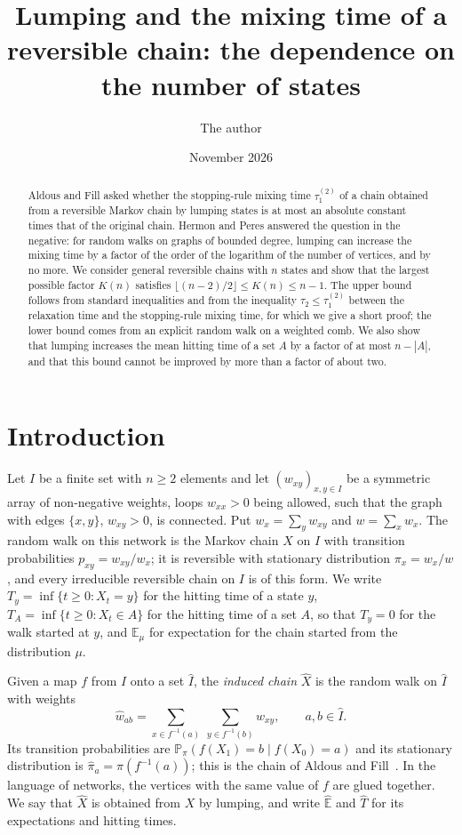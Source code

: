 \documentclass[11pt]{amsart}
\title[Lumping and the mixing time of a reversible chain]{Lumping and the mixing time of a reversible chain:
the dependence on the number of states}
\author{The author}
\date{November 2026}
\theoremstyle{definition}
\newcommand{\Prob}{\mathbb{P}}
\newcommand{\E}{\mathbb{E}}
\newcommand{\tmix}{\tau_1^{(2)}}
\newcommand{\hE}{\widehat{\E}}
\newcommand{\hw}{\widehat{w}}
\newcommand{\hpi}{\widehat{\pi}}
\newcommand{\hI}{\widehat{I}}
\newcommand{\hX}{\widehat{X}}
\begin{document}
\begin{abstract}
Aldous and Fill asked whether the stopping-rule mixing time $\tmix$ of a chain obtained from a reversible Markov
chain by lumping states is at most an absolute constant times that of the original chain. Hermon and Peres answered
the question in the negative: for random walks on graphs of bounded degree, lumping can increase the mixing time by a
factor of the order of the logarithm of the number of vertices, and by no more. We consider general reversible chains
with $n$ states and show that the largest possible factor $K(n)$ satisfies
$\lfloor (n-2)/2\rfloor\le K(n)\le n-1$. The upper bound follows from standard inequalities and from the inequality
$\tau_2\le\tmix$ between the relaxation time and the stopping-rule mixing time, for which we give a short proof;
the lower bound comes from an explicit random walk on a weighted comb. We also show that lumping increases the mean
hitting time of a set $A$ by a factor of at most $n-|A|$, and that this bound cannot be improved by more than a factor
of about two.
\end{abstract}
\maketitle

\section{Introduction}
Let $I$ be a finite set with $n\ge2$ elements and let $(w_{xy})_{x,y\in I}$ be a symmetric array of non-negative
weights, loops $w_{xx}>0$ being allowed, such that the graph with edges $\{x,y\}$, $w_{xy}>0$, is connected. Put
$w_x=\sum_y w_{xy}$ and $w=\sum_x w_x$. The random walk on this network is the Markov chain $X$ on $I$ with transition
probabilities $p_{xy}=w_{xy}/w_x$; it is reversible with stationary distribution $\pi_x=w_x/w$, and every irreducible
reversible chain on $I$ is of this form. We write $T_y=\inf\{t\ge0:X_t=y\}$ for the hitting time of a state $y$,
$T_A=\inf\{t\ge0:X_t\in A\}$ for the hitting time of a set $A$, so that $T_y=0$ for the walk started at $y$, and $\E_\mu$ for expectation for the chain started from the distribution $\mu$.

Given a map $f$ from $I$ onto a set $\hI$, the \emph{induced chain} $\hX$ is the random walk on $\hI$ with weights
\[
\hw_{ab}=\sum_{x\in f^{-1}(a)}\ \sum_{y\in f^{-1}(b)} w_{xy},\qquad a,b\in\hI .
\]
Its transition probabilities are $\Prob_\pi(f(X_1)=b\mid f(X_0)=a)$ and its stationary distribution is
$\hpi_a=\pi(f^{-1}(a))$; this is the chain of Aldous and Fill~\cite[Section~4.6.1]{AF}. In the language of networks,
the vertices with the same value of $f$ are glued together. We say that $\hX$ is obtained from $X$ by lumping, and
write $\hE$ and $\widehat{T}$ for its expectations and hitting times.
\end{document}
